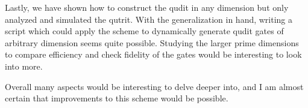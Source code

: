 Lastly, we have shown how to construct the qudit in any dimension but only analyzed and simulated the qutrit. With the generalization in hand, writing a script which could apply the scheme to dynamically generate qudit gates of arbitrary dimension seems quite possible. Studying the larger prime dimensions to compare efficiency and check fidelity of the gates would be interesting to look into more.

Overall many aspects would be interesting to delve deeper into, and I am almost certain that improvements to this scheme would be possible.
